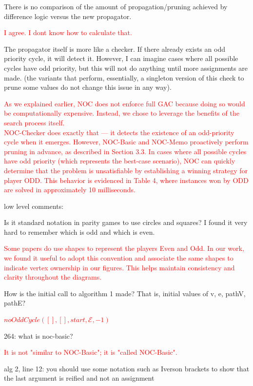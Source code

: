 \documentclass{article}
\begin{document}
There is no comparison of the amount of propagation/pruning achieved by difference logic versus the new propagator.

\textcolor{red}{I agree. I dont know how to calculate that.}

The propagator itself is more like a checker. If there already exists an odd priority cycle, it will detect it. However, I can imagine cases where all possible cycles have odd priority, but this will not do anything until more assignments are made. (the variants that perform, essentially, a singleton version of this check to prune some values do not change this issue in any way).

\textcolor{red}{
As we explained earlier, NOC does not enforce full GAC because doing so would be computationally expensive. Instead, we chose to leverage the benefits of the search process itself.\\
NOC-Checker does exactly that — it detects the existence of an odd-priority cycle when it emerges. However, NOC-Basic and NOC-Memo proactively perform pruning in advance, as described in Section 3.3. In cases where all possible cycles have odd priority (which represents the best-case scenario), NOC can quickly determine that the problem is unsatisfiable by establishing a winning strategy for player ODD. This behavior is evidenced in Table 4, where instances won by ODD are solved in approximately 10 milliseconds.}

low level comments:

Is it standard notation in parity games to use circles and squares? I found it very hard to remember which is odd and which is even.

\textcolor{red}{Some papers do use shapes to represent the players Even and Odd. In our work, we found it useful to adopt this convention and associate the same shapes to indicate vertex ownership in our figures. This helps maintain consistency and clarity throughout the diagrams.}

How is the initial call to algorithm 1 made? That is, initial values of v, e, pathV, pathE?

\textcolor{red}{$noOddCycle([],[],start,\mathcal{E},-1)$}

264: what is noc-basic?

\textcolor{red}{It is not "similar to NOC-Basic"; it is "called NOC-Basic".}

alg 2, line 12: you should use some notation such as Iverson brackets to show that the last argument is reified and not an assignment
\end{document}

